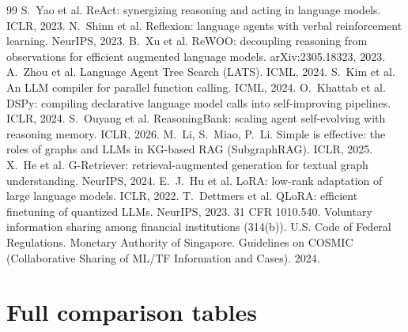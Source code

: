 \documentclass[11pt,a4paper]{article}
\begin{document}
\begin{thebibliography}{99}
 S.~Yao et al. ReAct: synergizing reasoning and acting in language models. ICLR, 2023.
 N.~Shinn et al. Reflexion: language agents with verbal reinforcement learning. NeurIPS, 2023.
 B.~Xu et al. ReWOO: decoupling reasoning from observations for efficient augmented language models. arXiv:2305.18323, 2023.
 A.~Zhou et al. Language Agent Tree Search (LATS). ICML, 2024.
 S.~Kim et al. An LLM compiler for parallel function calling. ICML, 2024.
 O.~Khattab et al. DSPy: compiling declarative language model calls into self-improving pipelines. ICLR, 2024.
 S.~Ouyang et al. ReasoningBank: scaling agent self-evolving with reasoning memory. ICLR, 2026.
 M.~Li, S.~Miao, P.~Li. Simple is effective: the roles of graphs and LLMs in KG-based RAG (SubgraphRAG). ICLR, 2025.
 X.~He et al. G-Retriever: retrieval-augmented generation for textual graph understanding. NeurIPS, 2024.
 E.~J.~Hu et al. LoRA: low-rank adaptation of large language models. ICLR, 2022.
 T.~Dettmers et al. QLoRA: efficient finetuning of quantized LLMs. NeurIPS, 2023.
 31 CFR 1010.540. Voluntary information sharing among financial institutions (314(b)). U.S. Code of Federal Regulations.
 Monetary Authority of Singapore. Guidelines on COSMIC (Collaborative Sharing of ML/TF Information and Cases). 2024.
\end{thebibliography}
\normalsize
\clearpage
\appendix
\section{Full comparison tables}
\end{document}
